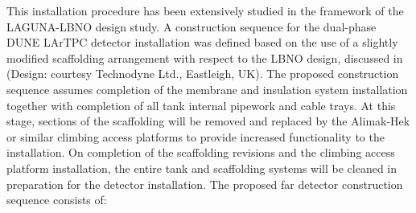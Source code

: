 This installation procedure has been extensively studied in the framework of the
LAGUNA-LBNO design study. A construction sequence for the dual-phase
DUNE LArTPC detector installation was defined based on the use of a
slightly modified scaffolding arrangement with respect to the LBNO
design, discussed in \anxlbnob 
(Design: courtesy Technodyne Ltd., Eastleigh, UK). The proposed
construction sequence assumes completion of the membrane and
insulation system installation together with completion of all tank
internal pipework and cable trays.  At this stage, sections of the
scaffolding will be removed and replaced by the Alimak-Hek or similar
climbing access platforms to provide increased functionality to the
installation.  On completion of the scaffolding revisions and the
climbing access platform installation, the entire tank and scaffolding
systems will be cleaned in preparation for the detector
installation. The proposed far detector construction sequence consists
of:
